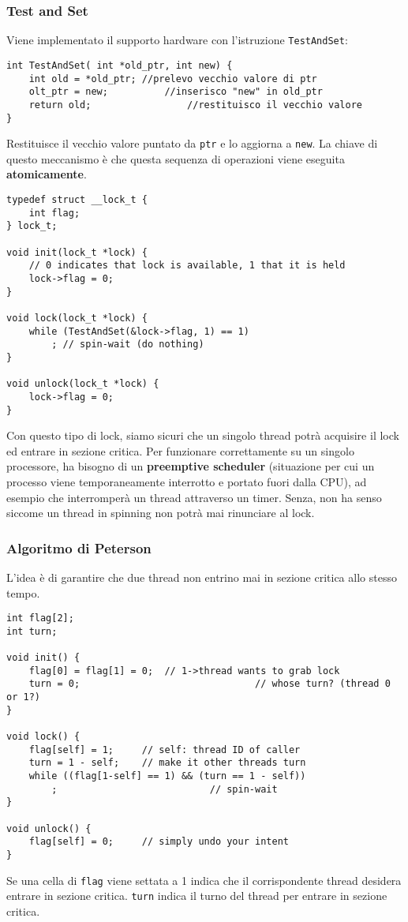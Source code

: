 \documentclass[12pt, twoside, letterpaper]{article}
\begin{document}
			\subsubsection{Test and Set}
				Viene implementato il supporto hardware con l'istruzione \texttt{TestAndSet}:
				\begin{lstlisting}[style=CStyle]
int TestAndSet( int *old_ptr, int new) {
	int old = *old_ptr; //prelevo vecchio valore di ptr
	olt_ptr = new;			//inserisco "new" in old_ptr
	return old;					//restituisco il vecchio valore
}				\end{lstlisting}
				Restituisce il vecchio valore puntato da \texttt{ptr} e lo aggiorna a \texttt{new}. La chiave di questo meccanismo è che questa sequenza di operazioni viene eseguita \textbf{atomicamente}. 
				\begin{lstlisting}[style=CStyle]
typedef struct __lock_t {
	int flag;
} lock_t;

void init(lock_t *lock) {
	// 0 indicates that lock is available, 1 that it is held
	lock->flag = 0;
}

void lock(lock_t *lock) {
	while (TestAndSet(&lock->flag, 1) == 1)
		; // spin-wait (do nothing)
}

void unlock(lock_t *lock) {
	lock->flag = 0;
}				\end{lstlisting}
				Con questo tipo di lock, siamo sicuri che un singolo thread potrà acquisire il lock ed entrare in sezione critica. Per funzionare correttamente su un singolo processore, ha bisogno di un \textbf{preemptive scheduler} (situazione per cui un processo viene temporaneamente interrotto e portato fuori dalla CPU), ad esempio che interromperà un thread attraverso un timer. Senza, non ha senso siccome un thread in spinning non potrà mai rinunciare al lock.
				
			\subsubsection{Algoritmo di Peterson}
				L'idea è di garantire che due thread non entrino mai in sezione critica allo stesso tempo.
				\begin{lstlisting}[style=CStyle]
int flag[2];
int turn;

void init() {
	flag[0] = flag[1] = 0;	// 1->thread wants to grab lock
	turn = 0;								// whose turn? (thread 0 or 1?)
}

void lock() {
	flag[self] = 1;		// self: thread ID of caller
	turn = 1 - self;	// make it other threads turn
	while ((flag[1-self] == 1) && (turn == 1 - self))
		; 							// spin-wait
}

void unlock() {
	flag[self] = 0;		// simply undo your intent
}				\end{lstlisting}
				Se una cella di \texttt{flag} viene settata a 1 indica che il corrispondente thread desidera entrare in sezione critica. \texttt{turn} indica il turno del thread per entrare in sezione critica.
				
\end{document}
